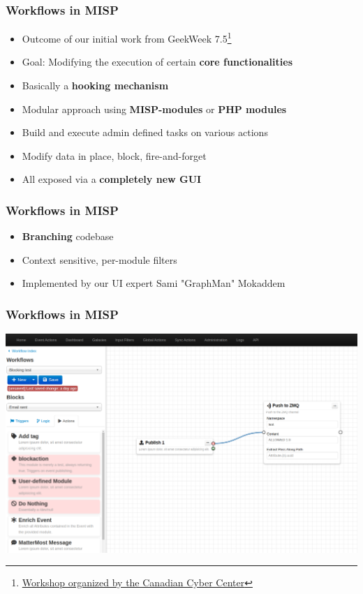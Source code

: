 \begin{frame}
  \frametitle{Workflows in MISP}
  \begin{itemize}
     \item Outcome of our initial work from GeekWeek 7.5\footnote{\href{https://cyber.gc.ca/en/events/geekweek-75}{Workshop organized by the Canadian Cyber Center}}
     \item Goal: Modifying the execution of certain {\bf core functionalities}
     \item Basically a {\bf hooking mechanism}
     \item Modular approach using {\bf MISP-modules} or {\bf PHP modules}
     \item Build and execute admin defined tasks on various actions
     \item Modify data in place, block, fire-and-forget
     \item All exposed via a {\bf completely new GUI}
  \end{itemize}
\end{frame}

\begin{frame}
  \frametitle{Workflows in MISP}
  \begin{itemize}
     \item {\bf Branching} codebase
     \item Context sensitive, per-module filters
     \item Implemented by our UI expert Sami "GraphMan" Mokaddem 
  \end{itemize}
\end{frame}


\begin{frame}
\frametitle{Workflows in MISP}
\includegraphics[scale=0.2]{images/workflows1.png}
\end{frame}


